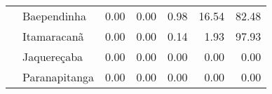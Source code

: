 \begin{table}[h]
\begin{tabular}{ll rrrrr}
                & Baependinha             &               0.00 &         0.00 &        0.98 &      16.54 &            82.48 \\ 
                & Itamaracanã             &               0.00 &         0.00 &        0.14 &       1.93 &            97.93 \\ 
                & Jaquereçaba             &               0.00 &         0.00 &        0.00 &       0.00 &             0.00 \\ 
                & Paranapitanga           &               0.00 &         0.00 &        0.00 &       0.00 &             0.00 \\ 
\bottomrule
\end{tabular}
\end{table}

